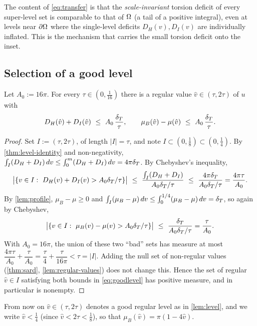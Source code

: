 The content of \eqref{eq:transfer} is that the \emph{scale-invariant}
torsion deficit of every super-level set is comparable to that of $\Omega$
(a tail of a positive integral), even at levels near $\partial\Omega$ where the
single-level deficits $D_H(v),D_I(v)$ are individually inflated. This is the
mechanism that carries the small torsion deficit onto the inset.

\subsection{Selection of a good level}

\begin{lemma}\label{lem:level}
Let $A_0:=16\pi$. For every $\tau\in(0,\tfrac1{16})$ there is a regular
value $\hat v\in(\tau,2\tau)$ of $u$ with
\begin{equation}\label{eq:goodlevel}
   D_H(\hat v)+D_I(\hat v)\ \le\ A_0\,\frac{\delta_T}{\tau},
   \qquad
   \mu_B(\hat v)-\mu(\hat v)\ \le\ A_0\,\frac{\delta_T}{\tau}.
\end{equation}
\end{lemma}

\begin{proof}
Set $I:=(\tau,2\tau)$, of length $|I|=\tau$, and note $I\subset(0,\tfrac18)
\subset(0,\tfrac14)$. By \cref{thm:level-identity} and non-negativity,
$\int_I(D_H+D_I)\,dv\le\int_0^m(D_H+D_I)\,dv=4\pi\delta_T$. By Chebyshev's
inequality,
\[
   \bigl|\{v\in I:\ D_H(v)+D_I(v)>A_0\dT/\tau\}\bigr|
   \ \le\ \frac{\int_I(D_H+D_I)}{A_0\dT/\tau}
   \ \le\ \frac{4\pi\dT}{A_0\dT/\tau}
   =\frac{4\pi\tau}{A_0}.
\]
By \cref{lem:profile}, $\mu_B-\mu\ge0$ and
$\int_I(\mu_B-\mu)\,dv\le\int_0^{1/4}(\mu_B-\mu)\,dv=\delta_T$, so again by
Chebyshev,
\[
   \bigl|\{v\in I:\ \mu_B(v)-\mu(v)>A_0\dT/\tau\}\bigr|
   \ \le\ \frac{\dT}{A_0\dT/\tau}
   =\frac{\tau}{A_0}.
\]
With $A_0=16\pi$, the union of these two ``bad'' sets has measure at most
$\dfrac{4\pi\tau}{A_0}+\dfrac{\tau}{A_0}=\dfrac{\tau}{4}+\dfrac{\tau}{16\pi}
<\tau=|I|$. Adding the null set of non-regular values
(\cref{thm:sard}, \cref{lem:regular-values}) does not change this. Hence the
set of regular $\hat v\in I$ satisfying both bounds in \eqref{eq:goodlevel}
has positive measure, and in particular is nonempty.
\end{proof}

From now on $\hat v\in(\tau,2\tau)$ denotes a good regular level as in
\cref{lem:level}, and we write $\hat v<\tfrac14$ (since $\hat v<2\tau<
\tfrac18$), so that $\mu_B(\hat v)=\pi(1-4\hat v)$.


